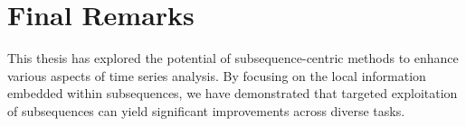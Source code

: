 \section{Final Remarks}

This thesis has explored the potential of subsequence-centric methods to enhance various aspects of time series analysis. 
By focusing on the local information embedded within subsequences, we have demonstrated that targeted exploitation of subsequences can yield significant improvements across diverse tasks.